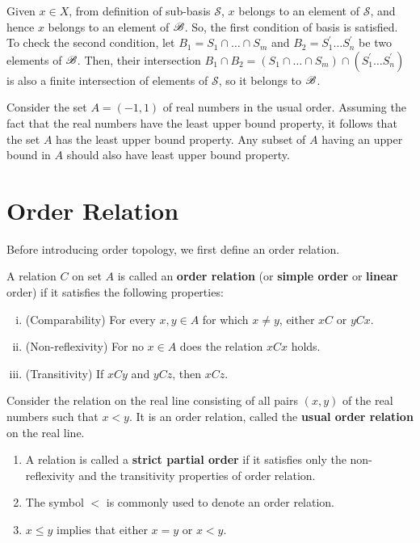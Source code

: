 \documentclass[a4paper,english,12pt]{article}
\begin{document}
Given $x \in X$, from definition of sub-basis $\mathcal{S}$, $x$ belongs to an element of $\mathcal{S}$, and hence $x$ belongs to an element of $\mathscr{B}$. So, the first condition of basis is satisfied. To check the second condition, let $B_{1} = S_{1} \cap \dots \cap S_{m}$ and $B_{2} = S_{1}^{'} \dots S_{n}^{'}$ be two elements of $\mathscr{B}$. Then, their intersection $B_{1} \cap B_{2} = (S_{1} \cap \dots \cap S_{m})  \cap (S_{1}^{'} \dots S_{n}^{'})$ is also a finite intersection of elements of $\mathcal{S}$, so it belongs to $\mathscr{B}$. 

\begin{exmp}
\begin{enumerate}[i)]
Consider the set $A = (-1, 1)$ of real numbers in the usual order. Assuming the fact that the real numbers have the least upper bound property, it follows that the set $A$ has the least upper bound property. Any subset of $A$ having an upper bound in $A$ should also have least upper bound property. 
\end{enumerate}
\end{exmp}

\section{Order Relation}  

Before introducing order topology, we first define an order relation.
\begin{defn}
A relation $C$ on set $A$ is called an \textbf{order relation} (or  \textbf{simple order} or \textbf{linear} order) if it satisfies the following properties:
\begin{enumerate}[i)]
\item (Comparability) For every $x, y \in A$ for which $x \neq y$, either $x C$ or $y C x$.
\item (Non-reflexivity) For no $x \in A$ does the relation $x C x$ holds.
\item (Transitivity) If $x C y$ and $y C z$, then $x C z$.
\end{enumerate}
\end{defn}

\begin{exmp}
Consider the relation on the real line consisting of all pairs $(x, y)$ of the real numbers such that $x < y$. It is an order relation, called the \textbf{usual order relation} on the real line.
\end{exmp}


\begin{rem}
\begin{enumerate}
\item A relation is called a \textbf{strict partial order} if it satisfies only the non-reflexivity and the transitivity properties of order relation.    
\item The symbol $<$ is commonly used to denote an order relation.
\item $x \le y$ implies that either $x = y$ or $x < y$. 
\end{enumerate}
\end{rem}
\end{document}
